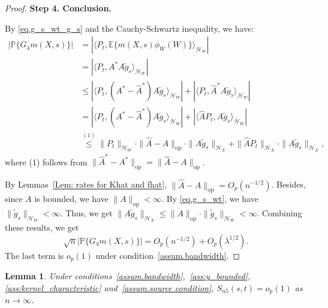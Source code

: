 \documentclass[
  12pt]{article}
\newtheorem{lemma}{Lemma}
\def\to{\rightarrow}
\def\wt{\widetilde}
\def\mP{\mathbb{P}}
\begin{document}
\begin{proof}
\noindent\textbf{Step 4. Conclusion.}

By \eqref{eq.g_s_wt_g_s} and the Cauchy-Schwartz inequality, we have:
\begin{align*}
	\left| \mathbb{P} \{G_4m(X,s) \} \right|&=\left| \langle P_t,\mathbb{E} \{ m(X,s)\phi_W(W)\} \rangle_{\mathcal{H}_W}  \right| \\
    & =\left| \langle P_t,A^*A\wt{g}_s \rangle_{\mathcal{H}_W}  \right|\\
	&\le \left| \langle P_t,(A^*-\widehat{A}^*)A\wt{g}_s \rangle_{\mathcal{H}_W}  \right|+\left| \langle P_t,\widehat{A}^*A\wt{g}_s \rangle_{\mathcal{H}_W}  \right|\\
	&=\left| \langle P_t,(A^*-\widehat{A}^*)A\wt{g}_s \rangle_{\mathcal{H}_W}  \right|+\left| \langle \widehat{A}P_t,A\wt{g}_s \rangle_{\mathcal{H}_W}  \right|\\
	&\overset{(1)}{\le}\| P_t\|_{\mathcal{H}_W}  \cdot \| \widehat{A}-A\|_{\mathrm{op}}\cdot \| A\wt{g}_s\|_{\mathcal{H}_X}  +\| \widehat{A}P_t\|_{\mathcal{H}_X}  \cdot \| A\wt{g}_s\|_{\mathcal{H}_X}  ,
\end{align*}
where (1) follows from $\|\widehat{A}^*-A^*\|_{\mathrm{op}}=\|\widehat{A}-A\|_{\mathrm{op}}$. 

By Lemmas~\ref{Lem: rates for Khat and fhat}, $\|\widehat{A}-A\|_{\mathrm{op}}=O_p(n^{-1/2})$. Besides, since $A$ is bounded, we have $\| A\|_{\mathrm{op}}<\infty$. By \eqref{eq.g_s_wt}, we have $\|\wt{g}_s\|_{\mathcal{H}_W}<\infty$. Thus, we get $\| A\wt{g}_s\|_{\mathcal{H}_X}\le\|A \|_{\mathrm{op}}\cdot\|\wt{g}_s\|_{\mathcal{H}_W}<\infty$. Combining these results, we get
\begin{equation}\label{eq: negligibility of inner product for G4}
\sqrt{n}|\mP\{G_4m(X,s)\}|= O_p(n^{-1/2})+O_p(\lambda^{1/2}).
\end{equation}
The last term is $o_p(1)$ under condition~\ref{assum.bandwidth}. 
\end{proof}

\begin{lemma}
\label{lemma:Tn5}
Under conditions~\ref{assum.bandwidth},~\ref{ass:y_bounded}, \ref{ass:kernel_characteristic} and~\ref{assum.source condition}, $S_{n5}(s,t)=o_{p}(1)$ as $n\to\infty$.
\end{lemma}
\end{document}
